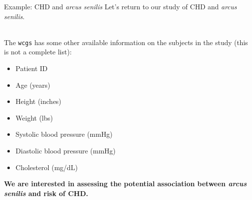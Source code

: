 \documentclass[10pt,t]{beamer}
\begin{document}
\begin{frame}{Example: CHD and \textit{arcus senilis}}
	Let's return to our study of CHD and \textit{arcus senilis}.
	\\ ~\
	
	The \texttt{wcgs} has some other available information on the subjects in the study (this is not a complete list):
	\begin{itemize}
		\item Patient ID
		\item Age (years)
		\item Height (inches)
		\item Weight (lbs)
		\item Systolic blood pressure (mmHg)
		\item Diastolic blood pressure (mmHg)
		\item Cholesterol (mg/dL)
	\end{itemize}  

	\textbf{We are interested in assessing the potential association between \textit{arcus senilis} and risk of CHD.} 
\end{frame}




%
%	
\end{document}
